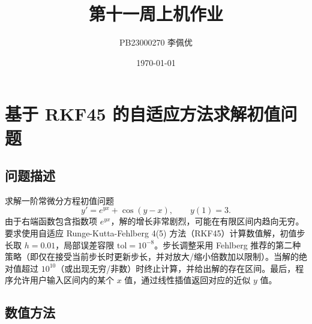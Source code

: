 \documentclass[12pt,a4paper]{article}
\title{第十一周上机作业}
\author{PB23000270 李佩优}
\date{\today}
\begin{document}
\maketitle

\section{基于 RKF45 的自适应方法求解初值问题}

\subsection{问题描述}
求解一阶常微分方程初值问题
\begin{equation}\label{eq:ivp}
    y' = e^{y x} + \cos(y - x), \qquad y(1) = 3.
\end{equation}
由于右端函数包含指数项 $e^{y x}$，解的增长非常剧烈，可能在有限区间内趋向无穷。要求使用自适应 Runge-Kutta-Fehlberg 4(5) 方法（RKF45）计算数值解，初值步长取 $h = 0.01$，局部误差容限 $\text{tol} = 10^{-8}$。步长调整采用 Fehlberg 推荐的第二种策略（即仅在接受当前步长时更新步长，并对放大/缩小倍数加以限制）。当解的绝对值超过 $10^{10}$（或出现无穷/非数）时终止计算，并给出解的存在区间。最后，程序允许用户输入区间内的某个 $x$ 值，通过线性插值返回对应的近似 $y$ 值。

\subsection{数值方法}
\end{document}
